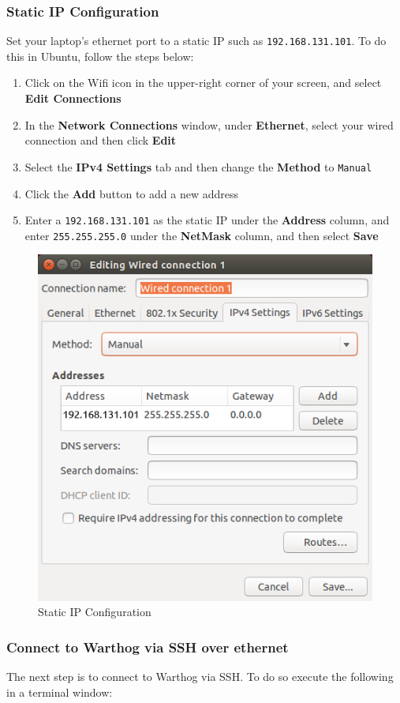 \documentclass[]{clearpath-latex/clearpath-manual}
\begin{document}
\subsubsection{Static IP Configuration}

Set your laptop's ethernet port to a static IP such as \lstinline{192.168.131.101}.  To do this in Ubuntu, follow the steps below:
\begin{enumerate}
  \item Click on the Wifi icon in the upper-right corner of your screen, and select \textbf{Edit Connections}
  \item In the \textbf{Network Connections} window, under \textbf{Ethernet}, select your wired connection and then click \textbf{Edit}
  \item Select the \textbf{IPv4 Settings} tab and then change the \textbf{Method} to \lstinline{Manual}
  \item Click the \textbf{Add} button to add a new address
  \item Enter a \lstinline{192.168.131.101} as the static IP under the \textbf{Address} column, and enter \lstinline{255.255.255.0} under the \textbf{NetMask} column, and then select \textbf{Save}
\end{enumerate}

\begin{figure}[H]
  \centering
  \includegraphics[width=0.5\linewidth]{wired_connection.png}
  \caption{Static IP Configuration}
  \label{staticip}
\end{figure}

\subsubsection{Connect to Warthog via SSH over ethernet}

The next step is to connect to Warthog via SSH.  To do so execute the following in a terminal window:
\end{document}
